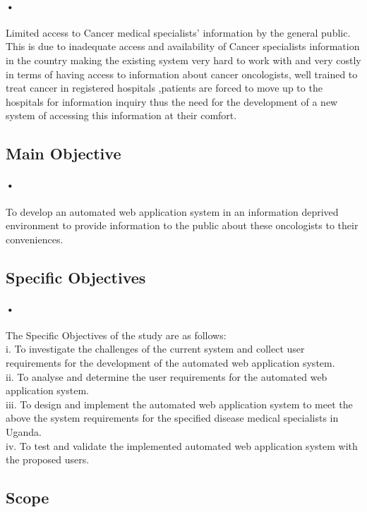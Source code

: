 \documentclass[12pt]{article}
\begin{document}
\paragraph{•}Limited access to Cancer medical specialists’ information by the general public. This is due to inadequate access and availability of Cancer specialists information in the country making the existing system very hard to work with and very costly in terms of having access to information about cancer oncologists, well trained to treat cancer in registered hospitals  ,patients are forced to move up to the hospitals for information inquiry thus the need for the development of a new system of accessing this information at their comfort.

\subsection{Main Objective}
\paragraph{•}To develop an automated web application system in an information deprived environment to provide information to the public about these oncologists to their conveniences.


\subsection{Specific Objectives}
\paragraph{•}The Specific Objectives of the study are as follows:
\\i.	To investigate the challenges of the current system and collect user requirements for the development of the automated web application system.
\\ii.	To analyse and determine the user requirements for the automated web application system.
\\iii.	To design and implement the automated web application system to meet the above the system requirements for the specified disease medical specialists in Uganda.  
\\iv.	To test and validate the implemented automated web application system with the proposed users.

\subsection{Scope}
\end{document}
